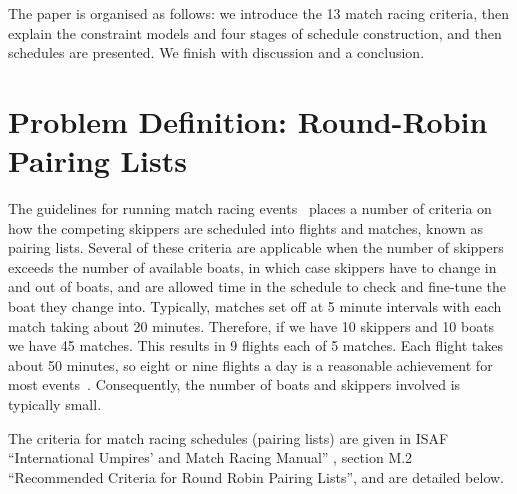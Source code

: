 \documentclass{llncs}
\begin{document}
The paper is organised as follows: we introduce the 13 match racing criteria, then explain the
constraint models and four stages of schedule construction, and then schedules are presented. We
finish with discussion and a conclusion.

\section{Problem Definition: Round-Robin Pairing Lists}\label{sec:definition}

The guidelines for running match racing events~\cite{isaf} places a number of criteria on how the
competing skippers are scheduled into flights and matches, known as pairing lists. Several of these
criteria are applicable when the number of skippers exceeds the number of available boats, in which
case skippers have to change in and out of boats, and are allowed time in the schedule to check and
fine-tune the boat they change into. Typically, matches set off at 5 minute intervals with each
match taking about 20 minutes. Therefore, if we have 10 skippers and 10 boats we have 45 matches.
This results in 9 flights each of 5 matches.  Each flight takes about 50 minutes, so eight or nine
flights a day is a reasonable achievement for most events~\cite{isaf}. Consequently, the number of
boats and skippers involved is typically small.

The criteria for  match racing schedules (pairing lists) are given in ISAF ``International Umpires'
and Match Racing Manual'' \cite{isaf}, section M.2 ``Recommended Criteria for Round Robin Pairing
Lists'', and are detailed below.
\end{document}
